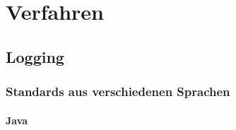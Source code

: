 \chapter{Verfahren}\label{ch:verfahren}


\section{Logging}\label{sec:logging-verfahren}

\subsection{Standards aus verschiedenen Sprachen}\label{subsec:standards-aus-verschiedenen-sprachen}

\subsubsection{Java}\label{subsubsec:java}
